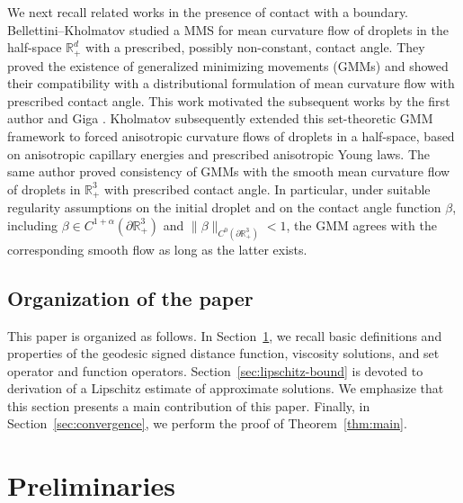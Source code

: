 \documentclass[11pt]{article}
\numberwithin{equation}{section}
\newcommand{\R}{\mathbb{R}}
\begin{document}
We next recall related works in the presence of contact with a boundary.
Bellettini--Kholmatov \cite{BK18} studied a MMS for mean curvature flow of droplets in the half-space $\mathbb{R}^d_+$ with a prescribed, possibly non-constant, contact angle.  They proved the existence of generalized minimizing movements (GMMs) and showed their compatibility with a distributional formulation of mean curvature flow with prescribed contact angle.  This work motivated the subsequent works by the first author and Giga \cite{EG24,EG25}.
Kholmatov \cite{K25-2} subsequently extended this set-theoretic GMM framework to forced anisotropic curvature flows of droplets in a half-space, based on anisotropic capillary energies and prescribed anisotropic Young laws.
The same author \cite{Kholmatov25} proved consistency of GMMs with the smooth mean curvature flow of droplets in $\mathbb{R}^3_+$ with prescribed contact angle.  In particular, under suitable regularity assumptions on the initial droplet and on the contact angle function $\beta$, including $\beta\in C^{1+\alpha}(\partial\R^3_+)$ and $\|\beta\|_{C^0(\partial\R^3_+)}<1$, the GMM agrees with the corresponding smooth flow as long as the latter exists.



\subsection*{Organization of the paper}
This paper is organized as follows. In Section~\ref{sec:preliminaries},
we recall basic definitions and properties of the geodesic signed distance function, viscosity solutions, and set operator and function operators. 
Section~\ref{sec:lipschitz-bound} is devoted to derivation of a Lipschitz estimate of approximate solutions. We emphasize that this section presents a main contribution of this paper.
Finally, in Section~\ref{sec:convergence}, we perform the proof of Theorem~\ref{thm:main}.

\section{Preliminaries}
\label{sec:preliminaries}
\end{document}
